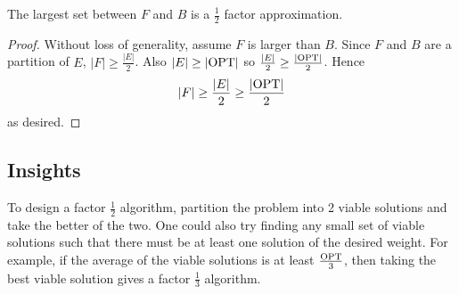 \documentclass{article}
\begin{document}
\begin{theorem*}
    The largest set between $F$ and $B$ is a $\frac{1}{2}$ factor approximation.
\end{theorem*}

\begin{proof}
    Without loss of generality, assume $F$ is larger than $B$. Since $F$ and $B$ are a
    partition of $E$, $|F| \geq \frac{|E|}{2}$. Also $|E| \geq |\mathrm{OPT}|$ so 
    $\frac{|E|}{2} \geq \frac{|\mathrm{OPT}|}{2}$. Hence 
    \begin{align*}
        |F| \geq \frac{|E|}{2} \geq \frac{|\mathrm{OPT}|}{2}
    \end{align*}
    as desired.
\end{proof}

\subsection*{Insights}

To design a factor $\frac{1}{2}$ algorithm, partition the problem into 2 viable
solutions and take the better of the two. One could also try finding any small set of 
viable solutions such that there must be at least one solution of the desired weight. 
For example, if the average of the viable solutions is at least $\frac{\mathrm{OPT}}{3}$, then
taking the best viable solution gives a factor $\frac{1}{3}$ algorithm.
\end{document}
